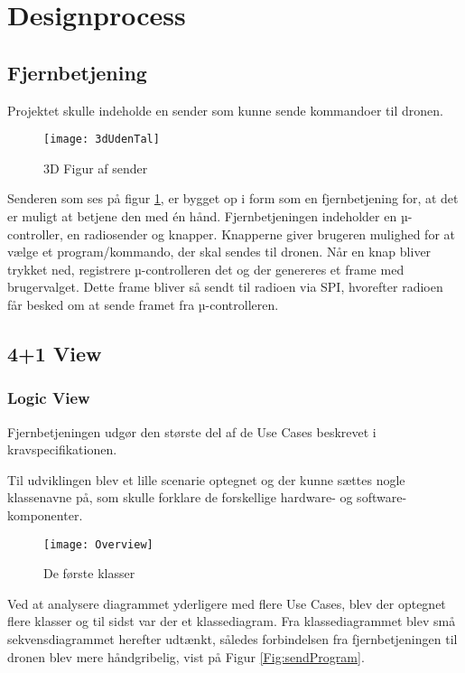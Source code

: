 \documentclass[Main]{subfiles}
\begin{document}
\section{Designprocess}

\subsection{Fjernbetjening}

Projektet skulle indeholde en sender som kunne sende kommandoer til dronen.

\begin{figure}[H]
\centering
\texttt{[image: 3dUdenTal]}
\caption{3D Figur af sender}
\label{Fig:3dUdenTal}
\end{figure}
\vspace{-20pt}

Senderen som ses på figur \ref{Fig:3dUdenTal}, er bygget op i form som en fjernbetjening for, at det er muligt at betjene den med én hånd.
Fjernbetjeningen indeholder en µ-controller, en radiosender og knapper.
Knapperne giver brugeren mulighed for at vælge et program/kommando, der skal sendes til dronen. 
Når en knap bliver trykket ned, registrere µ-controlleren det og der genereres et frame med brugervalget. 
Dette frame bliver så sendt til radioen via SPI, hvorefter radioen får besked om at sende framet fra µ-controlleren.


\newpage
\subsection{4+1 View}


\subsubsection*{Logic View}

Fjernbetjeningen udgør den største del af de Use Cases beskrevet i kravspecifikationen\cite[s. 7 -- 11]{Kravspec}.

Til udviklingen blev et lille scenarie optegnet og der kunne sættes nogle klassenavne på, som skulle forklare de forskellige hardware- og software-komponenter.

\begin{figure}[H]
\centering
\texttt{[image: Overview]}
\caption{De første klasser}
\label{Fig:Overview}
\end{figure}


Ved at analysere diagrammet yderligere med flere Use Cases, blev der optegnet flere klasser og til sidst var der et klassediagram. 
Fra klassediagrammet blev små sekvensdiagrammet herefter udtænkt, således forbindelsen fra fjernbetjeningen til dronen blev mere håndgribelig, vist på Figur \ref{Fig:sendProgram}.
\end{document}
